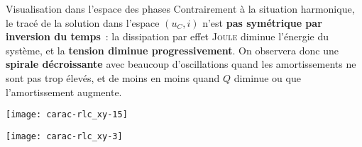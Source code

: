 \documentclass[../main/main.tex]{subfiles}
\begin{document}
\begin{NCexem}[width=\linewidth, sidebyside]{Visualisation dans l'espace des phases}
    Contrairement à la situation harmonique, le tracé de la solution dans
    l'espace $(u_C,i)$ n'est \textbf{pas symétrique par inversion du temps}~: la
    dissipation par effet \textsc{Joule} diminue l'énergie du système, et la
    \textbf{tension diminue progressivement}. On observera donc une
    \textbf{spirale décroissante} avec beaucoup d'oscillations quand les
    amortissements ne sont pas trop élevés, et de moins en moins quand $Q$
    diminue ou que l'amortissement augmente.
    \tcblower
    \begin{minipage}{0.49\linewidth}
        \begin{center}
            \texttt{[image: carac-rlc\_xy-15]}
        \end{center}
    \end{minipage}
    \begin{minipage}{0.49\linewidth}
        \begin{center}
            \texttt{[image: carac-rlc\_xy-3]}
        \end{center}
    \end{minipage}
\end{NCexem}
\end{document}
